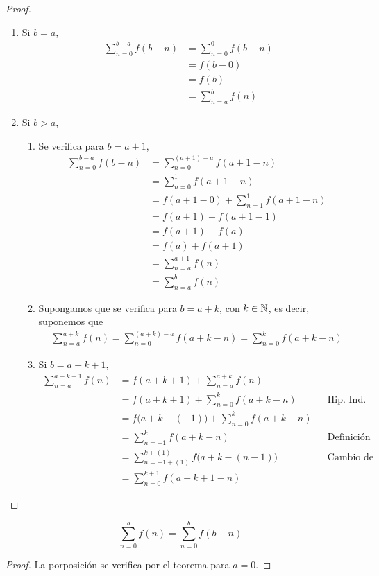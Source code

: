 \begin{enumerate}[label=\alph*)]
\begin{proof}
\begin{enumerate}[label=\Roman*)]
    \item Si $b=a$,
    \begin{align*}
      \sum_{n=0}^{b-a} f(b-n) &= \sum_{n=0}^{0} f(b-n)\\
      &= f(b-0)\\
      &= f(b)\\
      &= \sum_{n=a}^{b} f(n)
    \end{align*}
    

    \item Si $b>a$,
    \begin{enumerate}[label=\roman*)]
      \item Se verifica para $b=a+1$,
      \begin{align*}
        \sum_{n=0}^{b-a} f(b-n) &= \sum_{n=0}^{(a+1)-a} f(a+1-n)\\
        &= \sum_{n=0}^{1} f(a+1-n)\\
        &= f(a+1-0) + \sum_{n=1}^{1} f(a+1-n)\\
        &= f(a+1) + f(a+1-1)\\
        &= f(a+1) + f(a)\\
        &= f(a) + f(a+1)\\
        &= \sum_{n=a}^{a+1} f(n)\\
        &= \sum_{n=a}^{b} f(n)
      \end{align*}

      \item Supongamos que se verifica para $b=a+k$, con $k\in \mathbb{N}$, es decir, suponemos que
      \begin{align*}
        \sum_{n=a}^{a+k}f(n) = \sum_{n=0}^{(a+k)-a} f(a+k-n) = \sum_{n=0}^{k} f(a+k-n)
      \end{align*}

      \item Si $b=a+k+1$,
      \begin{align*}
        \sum_{n=a}^{a+k+1} f(n) &= f(a+k+1) + \sum_{n=a}^{a+k} f(n)\\
        &= f(a+k+1) + \sum_{n=0}^{k} f(a+k-n) && \text{Hip. Ind.}\\
        &= f\bigl(a+k-(-1)\bigr) + \sum_{n=0}^{k} f(a+k-n)\\
        &= \sum_{n=-1}^k f(a+k-n) && \text{Definición (de sumatoria)}\\
        &= \sum_{n=-1+(1)}^{k+(1)} f\bigl(a+k-(n-1)\bigr) && \text{Cambio de índice}\\
        &= \sum_{n=0}^{k+1} f(a+k+1-n)
      \end{align*}
      
    \end{enumerate}

    \end{enumerate}
  \end{proof}

   \[\sum_{n=0}^{b}f(n) = \sum_{n=0}^{b} f(b-n)\]

  \begin{proof}\leavevmode
    La porposición se verifica por el teorema para $a=0$.
  \end{proof}

    
  \end{enumerate}
